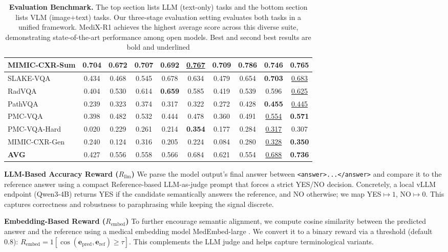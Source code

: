 \documentclass{article}
\theoremstyle{plain}
\theoremstyle{definition}
\theoremstyle{remark}
\begin{document}
\begin{table}[t!]
{\begin{tabular}{@{}lccccccccc@{}}
MIMIC-CXR-Sum    & 0.704 & 0.672 & 0.707 & 0.692 & \underline{0.767} & 0.709 & \textbf{0.786} & 0.746 & 0.765 \\
\midrule
SLAKE-VQA        & 0.434 & 0.468 & 0.545 & 0.678 & 0.634 & 0.479 & 0.654 & \textbf{0.703} & \underline{0.683} \\
RadVQA           & 0.404 & 0.530 & 0.614 & \textbf{0.659} & 0.585 & 0.419 & 0.539 & 0.596 & \underline{0.625} \\
PathVQA          & 0.239 & 0.323 & 0.374 & 0.317 & 0.322 & 0.272 & 0.428 & \textbf{0.455} & \underline{0.445} \\
PMC-VQA          & 0.398 & 0.482 & 0.532 & 0.444 & 0.478 & 0.360 & 0.491 & \underline{0.554} & \textbf{0.571} \\
PMC-VQA-Hard     & 0.020 & 0.229 & 0.261 & 0.214 & \textbf{0.354} & 0.177 & 0.284 & \underline{0.317} & 0.307 \\
MIMIC-CXR-Gen    & 0.240 & 0.124 & 0.316 & 0.205 & 0.224 & 0.084 & 0.280 & \underline{0.328} & \textbf{0.350} \\
\midrule
\textbf{AVG}     & 0.427 & 0.556 & 0.558 & 0.566 & 0.684 & 0.621 & 0.554 & \underline{0.688} & \textbf{0.736} \\
\bottomrule
\end{tabular}%
}
\caption{\textbf{Evaluation Benchmark.} The top section lists LLM (text-only) tasks and the bottom section lists VLM (image+text) tasks. Our three-stage evaluation setting evaluates both tasks in a unified framework. MediX-R1 achieves the highest average score across this diverse suite, demonstrating state-of-the-art performance among open models. Best and second best results are bold and \mbox{underlined}}
\label{tab:eval-benchmarks}
\end{table}


\noindent\textbf{LLM-Based Accuracy Reward ($R_{\text{llm}}$)}
We parse the model output’s final answer between {\footnotesize\texttt{<answer>...</answer>}} and compare it to the reference answer using a compact Reference-based LLM-as-judge prompt that forces a strict YES/NO decision. Concretely, a local vLLM endpoint (Qwen3-4B) returns YES if the candidate semantically answers the reference, and NO otherwise; we map YES$\mapsto 1$, NO$\mapsto 0$. This captures correctness and robustness to paraphrasing while keeping the signal discrete.

\noindent\textbf{Embedding-Based Reward ($R_{\text{embed}}$)}
To further encourage semantic alignment, we compute cosine similarity between the predicted answer and the reference using a medical embedding model MedEmbed-large \citep{balachandran2024medembed}. We convert it to a binary reward via a threshold (default 0.8): $R_{\text{embed}}{=}1[\cos(\mathbf{e}_{\text{pred}},\mathbf{e}_{\text{ref}})\ge\tau]$. This complements the LLM judge and helps capture terminological variants.
\end{document}
